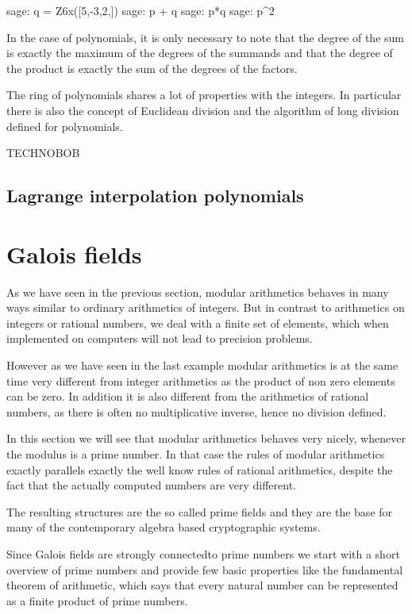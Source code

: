 \begin{sagecommandline}
sage: q = Z6x([5,-3,2,])
sage: p + q
sage: p*q
sage: p^2
\end{sagecommandline}

In the case of polynomials, it is only necessary to note that the degree of the sum is exactly the maximum of the degrees of the summands and that the degree of the product is exactly the sum of the degrees of the factors.

The ring of polynomials shares a lot of properties with the integers. In particular there is also the concept of Euclidean division and the algorithm of long division defined for polynomials.

\begin{definition}
TECHNOBOB
\end{definition}

\subsection{Lagrange interpolation polynomials}


\section{Galois fields}
As we have seen in the previous section, modular arithmetics behaves in many ways similar to ordinary arithmetics of integers. But in contrast to arithmetics on integers or rational numbers, we deal with a finite set of elements, which when implemented on computers will not lead to precision problems.

However as we have seen in the last example modular arithmetics is at the same time very different from integer arithmetics as the product of non zero elements can be zero. In addition it is also different from the arithmetics of rational numbers, as there is often no multiplicative inverse, hence no division defined. 

In this section we will see that modular arithmetics behaves very nicely, whenever the modulus is a prime number. In that case the rules of modular arithmetics exactly parallels exactly the well know rules of rational arithmetics, despite the fact that the actually computed numbers are very different.

The resulting structures are the so called prime fields and they are the base for many of the contemporary algebra based cryptographic systems.

Since Galois fields are strongly connectedto prime numbers we start with
a short overview of prime numbers and provide few basic properties like the fundamental theorem of arithmetic, which says that every natural number can be represented as a finite product of prime numbers.

